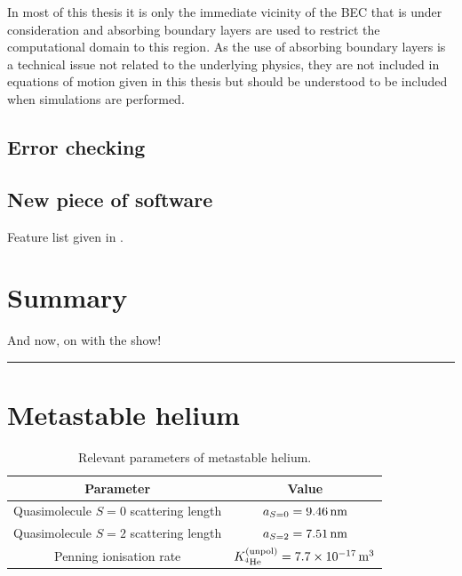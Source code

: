 \parasep

In most of this thesis it is only the immediate vicinity of the BEC that is under consideration and absorbing boundary layers are used to restrict the computational domain to this region.  As the use of absorbing boundary layers is a technical issue not related to the underlying physics, they are not included in equations of motion given in this thesis but should be understood to be included when simulations are performed.  


\subsection{Error checking}
\subsection{New piece of software}
Feature list given in .

\section{Summary}
And now, on with the show!
\hrule


\section{Metastable helium}
\label{BackgroundTheory:Helium}

\begin{table}
    \centering
    \begin{tabular}{cc}
    \toprule
    Parameter & Value\\
    \midrule
    Quasimolecule $S=0$ scattering length & $a_{S=0}=\unit[9.46]{nm}$\\
    Quasimolecule $S=2$ scattering length & $a_{S=2}=\unit[7.51]{nm}$\\
    Penning ionisation rate & $\Kunpol = \unit[7.7\times 10^{-17}]{m\textsuperscript{3}}$\\
    \bottomrule
    \end{tabular}
    \caption{\label{BackgroundTheory:He*Parameters} Relevant parameters of metastable helium.}
\end{table}


